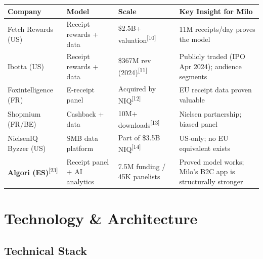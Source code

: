 \documentclass[11pt,a4paper]{article}
\begin{document}
\begin{center}
\renewcommand{\arraystretch}{1.3}
\begin{tabularx}{\textwidth}{L{3cm} L{2.8cm} R{2.5cm} L{4.5cm}}
\toprule
{}
\textbf{\color{white}Company} & \textbf{\color{white}Model} & \textbf{\color{white}Scale} & \textbf{\color{white}Key Insight for Milo} \\
\midrule
Fetch Rewards (US) & Receipt rewards + data & \$2.5B+ valuation\textsuperscript{[10]} & 11M receipts/day proves the model \\
Ibotta (US) & Receipt rewards + data & \$367M rev (2024)\textsuperscript{[11]} & Publicly traded (IPO Apr 2024); audience segments \\
Foxintelligence (FR) & E-receipt panel & Acquired by NIQ\textsuperscript{[12]} & EU receipt data proven valuable \\
Shopmium (FR/BE) & Cashback + data & 10M+ downloads\textsuperscript{[13]} & Nielsen partnership; biased panel \\
NielsenIQ Byzzer (US) & SMB data platform & Part of \$3.5B NIQ\textsuperscript{[14]} & US-only; no EU equivalent exists \\
\textbf{Algori (ES)}\textsuperscript{[23]} & Receipt panel + AI analytics & \texteuro{}7.5M funding / 45K panelists & Proved model works; Milo's B2C app is structurally stronger \\
\bottomrule
\end{tabularx}
\end{center}

\clearpage

\section{Technology \& Architecture}

\subsection{Technical Stack}
\end{document}
